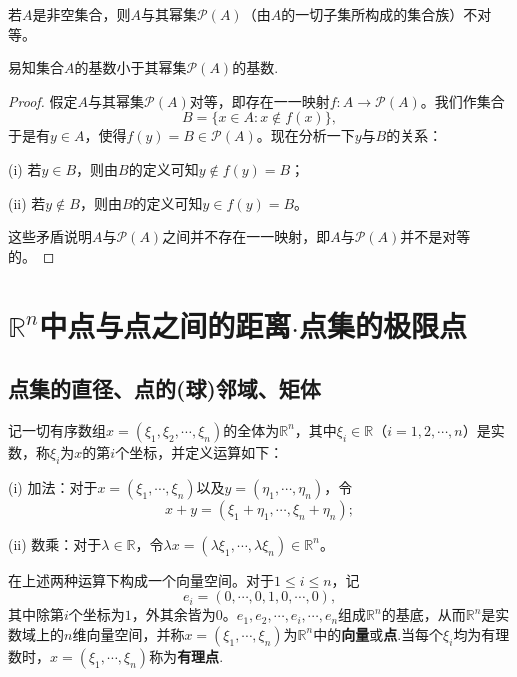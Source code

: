 \documentclass[lang=cn,newtx,10pt,scheme=chinese]{../Template/elegantbook}
\begin{document}
\begin{theorem}[无最大基数定理]\label{theorem:无最大基数定理}
若\(A\)是非空集合，则\(A\)与其幂集\(\mathcal{P}(A)\)（由\(A\)的一切子集所构成的集合族）不对等。
\end{theorem}
\begin{note}
  易知集合\(A\)的基数小于其幂集\(\mathcal{P}(A)\)的基数.
\end{note}
\begin{proof}
  假定\(A\)与其幂集\(\mathcal{P}(A)\)对等，即存在一一映射\(f:A\rightarrow\mathcal{P}(A)\)。我们作集合
\[B = \{x\in A:x\notin f(x)\},\]
于是有\(y\in A\)，使得\(f(y)=B\in\mathcal{P}(A)\)。现在分析一下\(y\)与\(B\)的关系：

(i) 若\(y\in B\)，则由\(B\)的定义可知\(y\notin f(y)=B\)；

(ii) 若\(y\notin B\)，则由\(B\)的定义可知\(y\in f(y)=B\)。

这些矛盾说明\(A\)与\(\mathcal{P}(A)\)之间并不存在一一映射，即\(A\)与\(\mathcal{P}(A)\)并不是对等的。
\end{proof}


\section{$\mathbb{R}^n$中点与点之间的距离$\cdot$点集的极限点}

\subsection{点集的直径、点的(球)邻域、矩体}

\begin{definition}\label{definition:Rn与Rn中的运算}
  记一切有序数组\(x = (\xi_1,\xi_2,\cdots,\xi_n)\)的全体为\(\mathbb{R}^n\)，其中\(\xi_i\in\mathbb{R}\)（\(i = 1,2,\cdots,n\)）是实数，称\(\xi_i\)为\(x\)的第\(i\)个坐标，并定义运算如下：

(i) 加法：对于\(x = (\xi_1,\cdots,\xi_n)\)以及\(y = (\eta_1,\cdots,\eta_n)\)，令
\[x + y = (\xi_1+\eta_1,\cdots,\xi_n+\eta_n);\]

(ii) 数乘：对于\(\lambda\in\mathbb{R}\)，令\(\lambda x = (\lambda\xi_1,\cdots,\lambda\xi_n)\in\mathbb{R}^n\)。

在上述两种运算下构成一个向量空间。对于\(1\leqslant i\leqslant n\)，记
\[e_i = (0,\cdots,0,1,0,\cdots,0),\]
其中除第\(i\)个坐标为\(1\)，外其余皆为\(0\)。\(e_1,e_2,\cdots,e_i,\cdots,e_n\)组成\(\mathbb{R}^n\)的基底，从而\(\mathbb{R}^n\)是实数域上的\(n\)维向量空间，并称\(x = (\xi_1,\cdots,\xi_n)\)为\(\mathbb{R}^n\)中的\textbf{向量}或\textbf{点}.当每个\(\xi_i\)均为有理数时，\(x = (\xi_1,\cdots,\xi_n)\)称为\textbf{有理点}.
\end{definition}
\end{document}
